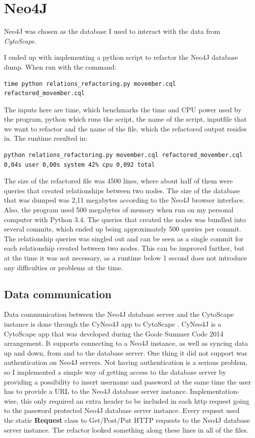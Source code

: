 \documentclass[UKenglish]{ifimaster}
\begin{document}
\chapter{Neo4J}
Neo4J was chosen as the database I used to interact with the data from
\textit{CytoScape}.

I ended up with implementing a python script to refactor the Neo4J database
dump. When run with the command:
\begin{verbatim}
time python relations_refactoring.py movember.cql refactored_movember.cql
\end{verbatim}
The inputs here are time, which benchmarks the time and CPU power used by the
program, python which runs the script, the name of the script, inputfile that we
want to refactor and the name of the file, which the refactored output resides
in.  The runtime resulted in:
\begin{verbatim}
python relations_refactoring.py movember.cql refactored_movember.cql
0,04s user 0,00s system 42% cpu 0,092 total
\end{verbatim}
The size of the refactored file was 4500 lines, where about half of them were
queries that created relationships between two nodes. The size of the database
that was dumped was 2,11 megabytes according to the Neo4J browser interface.
Also, the program used 500 megabytes of memory when run on my personal computer
with Python 3.4. The queries that created the nodes was bundled into several
commits, which ended up being approximately 500 queries per commit. The
relationship queries was singled out and can be seen as a single commit for each
relationship created between two nodes. This can be improved further, but at the
time it was not necessary, as a runtime below 1 second does not introduce any
difficulties or problems at the time.

\section{Data communication}
Data communication between the Neo4J database server and the CytoScape instance
is done through the CyNeo4J app to CytoScape \cite{cyneo4j}. CyNeo4J is a
CytoScape app that was developed during the Goole Summer Code 2014 arrangement.
It supports connecting to a Neo4J instance, as well as syncing data up and down,
from and to the database server. One thing it did not support was authentication
on Neo4J servers. Not having authentication is a serious problem, so I
implemented a simple way of getting access to the database server by providing a
possibility to insert username and password at the same time the user has to
provide a URL to the Neo4J database server instance. Implementation-wise, this
only required an extra header to be included in each http request going to the
password protected Neo4J database server instance. Every request used the static
\textbf{Request} class to Get/Post/Put HTTP requests to the Neo4J database
server instance. The refactor looked something along these lines in all of the
files.
\end{document}
